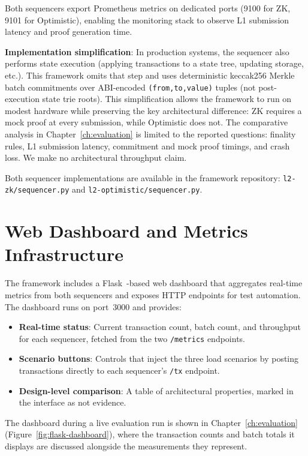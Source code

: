 Both sequencers export Prometheus metrics on dedicated ports (9100 for ZK, 9101 for Optimistic), enabling the monitoring stack to observe L1 submission latency and proof generation time.

\textbf{Implementation simplification}: In production systems, the sequencer also performs state execution (applying transactions to a state tree, updating storage, etc.). This framework omits that step and uses deterministic keccak256 Merkle batch commitments over ABI-encoded \texttt{(from,to,value)} tuples (not post-execution state trie roots). This simplification allows the framework to run on modest hardware while preserving the key architectural difference: ZK requires a mock proof at every submission, while Optimistic does not. The comparative analysis in Chapter~\ref{ch:evaluation} is limited to the reported questions: finality rules, L1 submission latency, commitment and mock proof timings, and crash loss. We make no architectural throughput claim.

Both sequencer implementations are available in the framework repository: \texttt{l2-zk/sequencer.py} and \texttt{l2-optimistic/sequencer.py}.

\section{Web Dashboard and Metrics Infrastructure}
\label{sec:metrics-design}

The framework includes a Flask~\cite{flask2024}-based web dashboard that aggregates real-time metrics from both sequencers and exposes HTTP endpoints for test automation. The dashboard runs on port~3000 and provides:

\begin{itemize}
    \item \textbf{Real-time status}: Current transaction count, batch count, and throughput for each sequencer, fetched from the two \texttt{/metrics} endpoints.
    \item \textbf{Scenario buttons}: Controls that inject the three load scenarios by posting transactions directly to each sequencer's \texttt{/tx} endpoint.
    \item \textbf{Design-level comparison}: A table of architectural properties, marked in the interface as not evidence.
\end{itemize}

The dashboard during a live evaluation run is shown in Chapter~\ref{ch:evaluation} (Figure~\ref{fig:flask-dashboard}), where the transaction counts and batch totals it displays are discussed alongside the measurements they represent.

